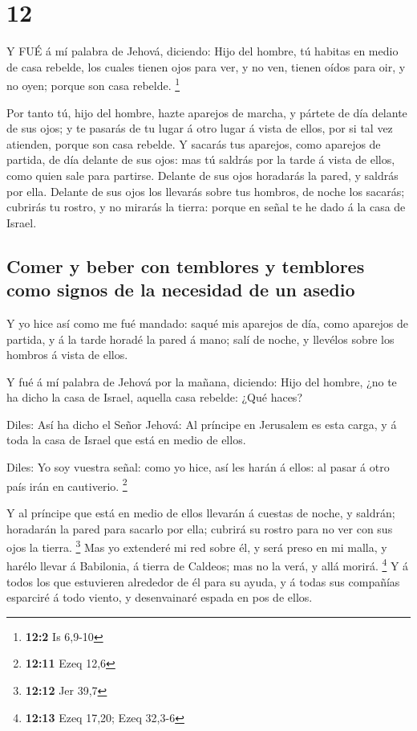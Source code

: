 \hypertarget{section-11}{%
\section{12}\label{section-11}}

 Y FUÉ á mí palabra de Jehová, diciendo:  Hijo
del hombre, tú habitas en medio de casa rebelde, los cuales tienen ojos
para ver, y no ven, tienen oídos para oir, y no oyen; porque son casa
rebelde. \footnote{\textbf{12:2} Is 6,9-10}

 Por tanto tú, hijo del hombre, hazte aparejos de marcha, y
pártete de día delante de sus ojos; y te pasarás de tu lugar á otro
lugar á vista de ellos, por si tal vez atienden, porque son casa
rebelde.  Y sacarás tus aparejos, como aparejos de partida,
de día delante de sus ojos: mas tú saldrás por la tarde á vista de
ellos, como quien sale para partirse.  Delante de sus ojos
horadarás la pared, y saldrás por ella.  Delante de sus ojos
los llevarás sobre tus hombros, de noche los sacarás; cubrirás tu
rostro, y no mirarás la tierra: porque en señal te he dado á la casa de
Israel.

\hypertarget{comer-y-beber-con-temblores-y-temblores-como-signos-de-la-necesidad-de-un-asedio}{%
\subsection{Comer y beber con temblores y temblores como signos de la
necesidad de un
asedio}\label{comer-y-beber-con-temblores-y-temblores-como-signos-de-la-necesidad-de-un-asedio}}

 Y yo hice así como me fué mandado: saqué mis aparejos de
día, como aparejos de partida, y á la tarde horadé la pared á mano; salí
de noche, y llevélos sobre los hombros á vista de ellos.

 Y fué á mí palabra de Jehová por la mañana, diciendo:
 Hijo del hombre, ¿no te ha dicho la casa de Israel, aquella
casa rebelde: ¿Qué haces?

 Diles: Así ha dicho el Señor Jehová: Al príncipe en
Jerusalem es esta carga, y á toda la casa de Israel que está en medio de
ellos.

 Diles: Yo soy vuestra señal: como yo hice, así les harán á
ellos: al pasar á otro país irán en cautiverio. \footnote{\textbf{12:11}
  Ezeq 12,6}

 Y al príncipe que está en medio de ellos llevarán á
cuestas de noche, y saldrán; horadarán la pared para sacarlo por ella;
cubrirá su rostro para no ver con sus ojos la tierra. \footnote{\textbf{12:12}
  Jer 39,7}  Mas yo extenderé mi red sobre él, y será preso
en mi malla, y harélo llevar á Babilonia, á tierra de Caldeos; mas no la
verá, y allá morirá. \footnote{\textbf{12:13} Ezeq 17,20; Ezeq 32,3-6}
 Y á todos los que estuvieren alrededor de él para su
ayuda, y á todas sus compañías esparciré á todo viento, y desenvainaré
espada en pos de ellos.

